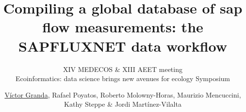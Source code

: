 \usepackage{textpos}
\usepackage{fontspec}

\setsansfont{Raleway}
\setmainfont{Sanchez}

\title[The SAPFLUXNET data workflow]{Compiling a global database of sap flow measurements: the SAPFLUXNET data workflow}
\subtitle{XIV MEDECOS \& XIII AEET meeting\\Ecoinformatics: data science brings new avenues for ecology Symposium}
\author[Víctor Granda \emph{et al.}]{\underline{Víctor Granda}, Rafael Poyatos, Roberto Molowny-Horas, Maurizio Mencuccini, Kathy Steppe \& Jordi Martínez-Vilalta}

